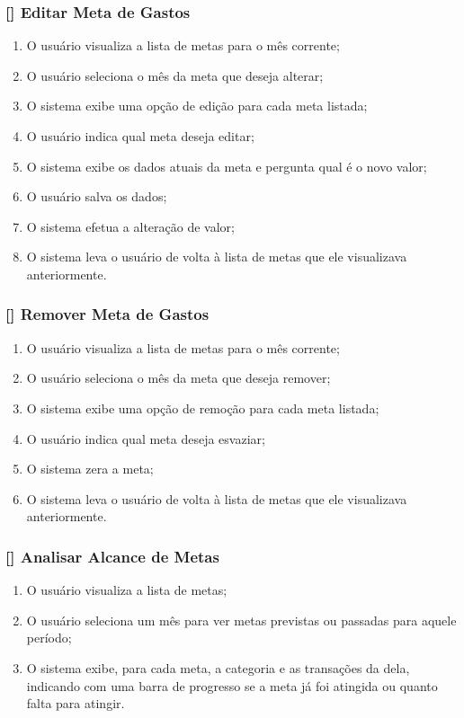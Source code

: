 \documentclass[a4paper]{abnt}
\begin{document}
\subsubsection{[\UC] Editar Meta de Gastos}
\begin{enumerate}[itemsep=-1ex]
	\item O usuário visualiza a lista de metas para o mês corrente;
	\item O usuário seleciona o mês da meta que deseja alterar;
	\item O sistema exibe uma opção de edição para cada meta listada;
	\item O usuário indica qual meta deseja editar;
	\item O sistema exibe os dados atuais da meta e pergunta qual é o novo valor;
	\item O usuário salva os dados;
	\item O sistema efetua a alteração de valor;
	\item O sistema leva o usuário de volta à lista de metas que ele visualizava anteriormente.
\end{enumerate}

\subsubsection{[\UC] Remover Meta de Gastos}
\begin{enumerate}[itemsep=-1ex]
	\item O usuário visualiza a lista de metas para o mês corrente;
	\item O usuário seleciona o mês da meta que deseja remover;
	\item O sistema exibe uma opção de remoção para cada meta listada;
	\item O usuário indica qual meta deseja esvaziar;
	\item O sistema zera a meta;
	\item O sistema leva o usuário de volta à lista de metas que ele visualizava anteriormente.
\end{enumerate}

\subsubsection{[\UC] Analisar Alcance de Metas}
\begin{enumerate}[itemsep=-1ex]
	\item O usuário visualiza a lista de metas;
	\item O usuário seleciona um mês para ver metas previstas ou passadas para aquele período;
	\item O sistema exibe, para cada meta, a categoria e as transações da dela, indicando com uma barra de progresso se a meta já foi atingida ou quanto falta para atingir.
\end{enumerate}
\end{document}
